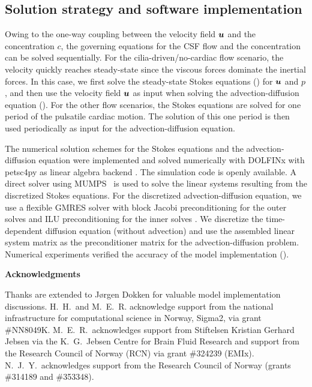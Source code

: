\documentclass{WileyMSP-template}
\begin{document}
\subsection{Solution strategy and software implementation}
Owing to the one-way coupling between the velocity field $\bm{u}$
and the concentration $c$, the governing equations for the
CSF flow and the concentration can be solved sequentially.
For the cilia-driven/no-cardiac flow scenario, the velocity quickly reaches steady-state since
the viscous forces dominate the inertial forces.
In this case, we first solve the steady-state Stokes equations ()
for $\bm{u}$ and $p$, and then use the velocity field $\bm{u}$ as input when solving
the advection-diffusion equation ().
For the other flow scenarios, the Stokes equations are solved for one
period of the pulsatile cardiac motion. The solution of this one period
is then used periodically as input for the advection-diffusion equation.

The numerical solution schemes for the Stokes equations and the
advection-diffusion equation were implemented and solved numerically with
DOLFINx with petsc4py as linear algebra backend
\cite{dolfinx2023preprint, Dalcin2011ParallelPython}.
The simulation code is openly
available.
A direct solver using MUMPS~\cite{Amestoy2011Mumps} is used to solve the
linear systems resulting from the discretized Stokes equations.
For the discretized advection-diffusion equation, we use a flexible GMRES solver
with block Jacobi preconditioning for the outer solves
and ILU preconditioning for the inner solves
\cite{fgmres, Jacobi1845UeberGleichungen, chan1997approximate}. 
We discretize the time-dependent diffusion equation (without advection)
and use the assembled linear system matrix
as the preconditioner matrix for the advection-diffusion problem.
Numerical experiments verified the accuracy of the model implementation
(). 

\medskip
\noindent \textbf{Acknowledgments} \par
\noindent Thanks are extended to J\o rgen Dokken
for valuable model implementation discussions.  H.~H.~and
M.~E.~R. acknowledge support from the national infrastructure for
computational science in Norway, Sigma2, via grant
\#NN8049K. M.~E.~R.~acknowledges support from Stiftelsen Kristian
Gerhard Jebsen via the K.~G.~Jebsen Centre for Brain Fluid Research
and support from the Research Council of Norway (RCN) via grant
\#324239 (EMIx). N.~J.~Y.~acknowledges support from the Research
Council of Norway (grants \#314189 and \#353348).
\end{document}

